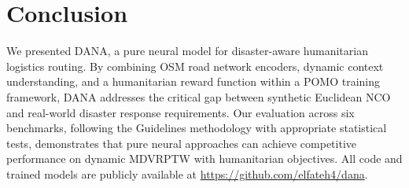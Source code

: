 \documentclass[12pt,a4paper]{article}
\begin{document}
\section{Conclusion}

We presented DANA, a pure neural model for disaster-aware humanitarian
logistics routing. By combining OSM road network encoders, dynamic context
understanding, and a humanitarian reward function within a POMO training
framework, DANA addresses the critical gap between synthetic Euclidean NCO and
real-world disaster response requirements. Our evaluation across six
benchmarks, following the Guidelines methodology with appropriate statistical
tests, demonstrates that pure neural approaches can achieve competitive
performance on dynamic MDVRPTW with humanitarian objectives. All code and
trained models are publicly available at
\url{https://github.com/elfateh4/dana}.



\end{document}
